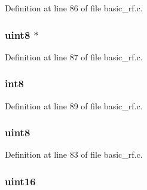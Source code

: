 Definition at line 86 of file basic\_\-rf.c.

\hypertarget{typebasic_rf_rx_info__t_a222e38ac15460c2849b31798658c855a}{
\subsubsection[{pPayload}]{ {\bfseries uint8 $\ast$ } }}
\label{typebasic_rf_rx_info__t_a222e38ac15460c2849b31798658c855a}


Definition at line 87 of file basic\_\-rf.c.

\hypertarget{typebasic_rf_rx_info__t_ae45a4d6bebffcd444ceebbfa5c7c225f}{
\subsubsection[{rssi}]{ {\bfseries int8 } }}
\label{typebasic_rf_rx_info__t_ae45a4d6bebffcd444ceebbfa5c7c225f}


Definition at line 89 of file basic\_\-rf.c.

\hypertarget{typebasic_rf_rx_info__t_afc25a1ae66f46cc1475e43591acbc18b}{
\subsubsection[{seqNumber}]{ {\bfseries uint8 } }}
\label{typebasic_rf_rx_info__t_afc25a1ae66f46cc1475e43591acbc18b}


Definition at line 83 of file basic\_\-rf.c.

\hypertarget{typebasic_rf_rx_info__t_af48612ab72df97fb9d6010c4c36841d0}{
\subsubsection[{srcAddr}]{ {\bfseries uint16 } }}
\label{typebasic_rf_rx_info__t_af48612ab72df97fb9d6010c4c36841d0}


